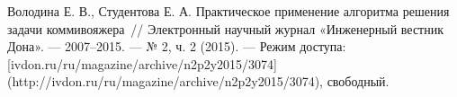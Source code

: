 \begin{thebibliography}{}

Володина Е. В., Студентова Е. А. Практическое применение алгоритма решения задачи коммивояжера~// Электронный научный журнал «Инженерный вестник Дона». — 2007–2015. — № 2, ч. 2 (2015). — Режим доступа: [ivdon.ru/ru/magazine/archive/n2p2y2015/3074](http://ivdon.ru/ru/magazine/archive/n2p2y2015/3074), свободный.

\end{thebibliography}
